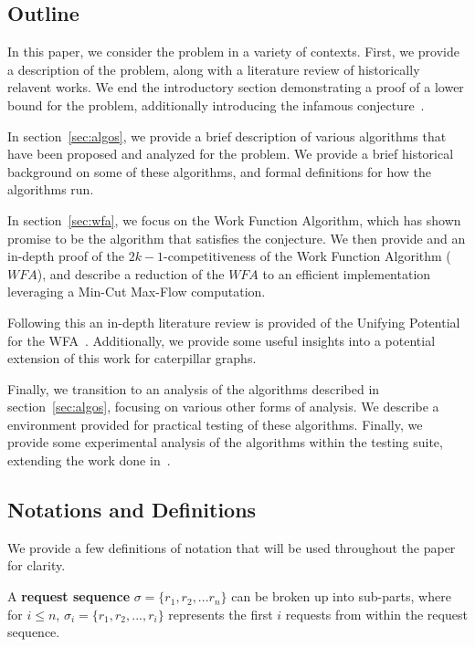 \subsection{Outline}
\label{sec:out}
In this paper, we consider the \KS problem in a variety of contexts. First, we provide a description of the \KS problem, along with a literature review of historically relavent works. We end the introductory section demonstrating a proof of a lower bound for the problem, additionally introducing the infamous \KS conjecture~\cite{KS1988}. 

In section~\ref{sec:algos}, we provide a brief description of various algorithms that have been proposed and analyzed for the \KS problem. We provide a brief historical background on some of these algorithms, and formal definitions for how the algorithms run.

In section~\ref{sec:wfa}, we focus on the Work Function Algorithm, which has shown promise to be the algorithm that satisfies the \KS conjecture. We then provide and an in-depth proof of the $2k-1$-competitiveness of the Work Function Algorithm ($WFA$), and describe a reduction of the $WFA$ to an efficient implementation leveraging a Min-Cut Max-Flow computation.

Following this an in-depth literature review is provided of the Unifying Potential for the WFA~\cite{unifyingPotential2021}. Additionally, we provide some useful insights into a potential extension of this work for caterpillar graphs. 

Finally, we transition to an analysis of the algorithms described in section~\ref{sec:algos}, focusing on various other forms of analysis. We describe a \CC environment provided for practical testing of these algorithms. Finally, we provide some experimental analysis of the algorithms within the testing suite, extending the work done in~\cite{independantStudy2023}.

\subsection{Notations and Definitions}

We provide a few definitions of notation that will be used throughout the paper for clarity.

\begin{definition}
    A \textbf{request sequence} $\sigma = \{ r_1, r_2, ... r_n\}$ can be broken up into sub-parts, where for $i \leq n$, $\sigma_i = \{ r_1, r_2, ..., r_i\}$ represents the first $i$ requests from within the request sequence.
\end{definition}

